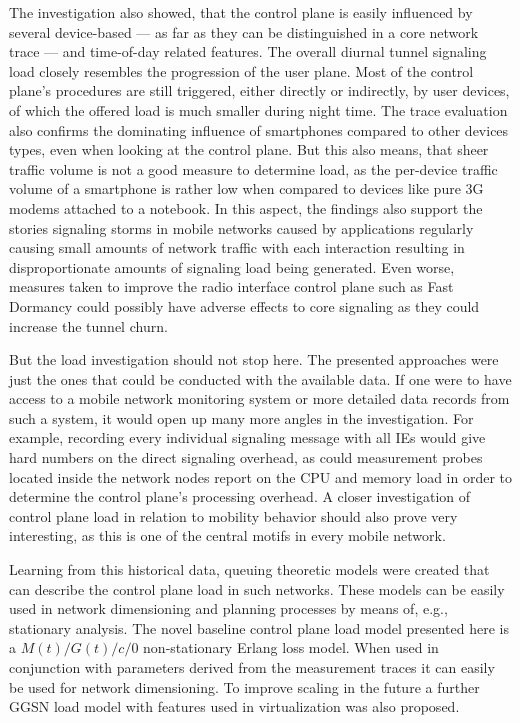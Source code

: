 The investigation also showed, that the control plane is easily influenced by several device-based --- as far as they can be distinguished in a core network trace --- and time-of-day related features. The overall diurnal tunnel signaling load closely resembles the progression of the user plane. Most of the control plane's procedures are still triggered, either directly or indirectly, by user devices, of which the offered load is much smaller during night time. The trace evaluation also confirms the dominating influence of smartphones compared to other devices types, even when looking at the control plane. But this also means, that sheer traffic volume is not a good measure to determine load, as the per-device traffic volume of a smartphone is rather low when compared to devices like pure \gls{3G} modems attached to a notebook. In this aspect, the findings also support the stories signaling storms in mobile networks caused by applications regularly causing small amounts of network traffic with each interaction resulting in disproportionate amounts of signaling load being generated. Even worse, measures taken to improve the radio interface control plane such as Fast Dormancy could possibly have adverse effects to core signaling as they could increase the tunnel churn.

But the load investigation should not stop here. The presented approaches were just the ones that could be conducted with the available data. If one were to have access to a mobile network monitoring system or more detailed data records from such a system, it would open up many more angles in the investigation. For example, recording every individual signaling message with all \glspl{IE} would give hard numbers on the direct signaling overhead, as could measurement probes located inside the network nodes report on the CPU and memory load in order to determine the control plane's processing overhead. A closer investigation of control plane load in relation to mobility behavior should also prove very interesting, as this is one of the central motifs in every mobile network.

Learning from this historical data, queuing theoretic models were created that can describe the control plane load in such networks. These models can be easily used in network dimensioning and planning processes by means of, e.g., stationary analysis. The novel baseline control plane load model presented here is a  $M(t)/G(t)/c/0$ non-stationary Erlang loss model. When used in conjunction with parameters derived from the measurement traces it can easily be used for network dimensioning. To improve scaling in the future a further \gls{GGSN} load model with features used in virtualization was also proposed.

